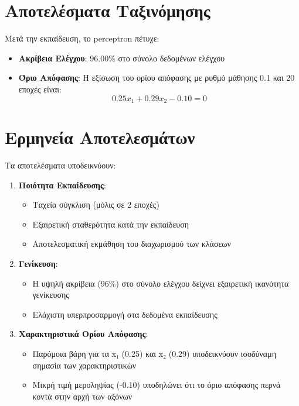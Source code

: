 \documentclass[12pt,a4paper,twoside]{book}
\begin{document}
\section{Αποτελέσματα Ταξινόμησης}

Μετά την εκπαίδευση, το perceptron πέτυχε:

\begin{itemize}
    \item \textbf{Ακρίβεια Ελέγχου}: 96.00\% στο σύνολο δεδομένων ελέγχου
    \item \textbf{Όριο Απόφασης}: Η εξίσωση του ορίου απόφασης με ρυθμό μάθησης 0.1 και 20 εποχές είναι:
    \[0.25x_1 + 0.29x_2 - 0.10 = 0\]
\end{itemize}

\section{Ερμηνεία Αποτελεσμάτων}

Τα αποτελέσματα υποδεικνύουν:

\begin{enumerate}
    \item \textbf{Ποιότητα Εκπαίδευσης}:
    \begin{itemize}
        \item Ταχεία σύγκλιση (μόλις σε 2 εποχές)
        \item Εξαιρετική σταθερότητα κατά την εκπαίδευση
        \item Αποτελεσματική εκμάθηση του διαχωρισμού των κλάσεων
    \end{itemize}
    \item \textbf{Γενίκευση}:
    \begin{itemize}
        \item Η υψηλή ακρίβεια (96\%) στο σύνολο ελέγχου δείχνει εξαιρετική ικανότητα γενίκευσης
        \item Ελάχιστη υπερπροσαρμογή στα δεδομένα εκπαίδευσης
    \end{itemize}
    \item \textbf{Χαρακτηριστικά Ορίου Απόφασης}:
    \begin{itemize}
        \item Παρόμοια βάρη για τα x₁ (0.25) και x₂ (0.29) υποδεικνύουν ισοδύναμη σημασία των χαρακτηριστικών
        \item Μικρή τιμή μεροληψίας (-0.10) υποδηλώνει ότι το όριο απόφασης περνά κοντά στην αρχή των αξόνων
    \end{itemize}
\end{enumerate}
\end{document}
